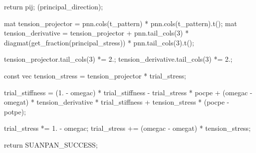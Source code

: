 \begin{cppcode}
{{{			return pij;
		}(principal_direction);

		mat tension_projector = pnn.cols(t_pattern) * pnn.cols(t_pattern).t();
		mat tension_derivative = tension_projector + pnn.tail_cols(3) * diagmat(get_fraction(principal_stress)) * pnn.tail_cols(3).t();

		tension_projector.tail_cols(3) *= 2.;
		tension_derivative.tail_cols(3) *= 2.;

		const vec tension_stress = tension_projector * trial_stress;

		trial_stiffness = (1. - omegac) * trial_stiffness - trial_stress * pocpe + (omegac - omegat) * tension_derivative * trial_stiffness + tension_stress * (pocpe - potpe);

		trial_stress *= 1. - omegac;
		trial_stress += (omegac - omegat) * tension_stress;
	}

	return SUANPAN_SUCCESS;
}
\end{cppcode}